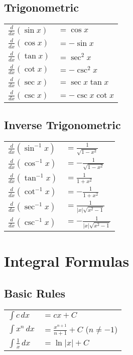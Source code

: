 \documentclass[12pt]{article}
\begin{document}
\vspace{1em}
\subsection*{Trigonometric}
\begin{tabular}{@{}ll@{}}
\toprule
$\displaystyle \frac{d}{dx}(\sin x)$ & $= \cos x$ \\
$\displaystyle \frac{d}{dx}(\cos x)$ & $= -\sin x$ \\
$\displaystyle \frac{d}{dx}(\tan x)$ & $= \sec^2 x$ \\
$\displaystyle \frac{d}{dx}(\cot x)$ & $= -\csc^2 x$ \\
$\displaystyle \frac{d}{dx}(\sec x)$ & $= \sec x \tan x$ \\
$\displaystyle \frac{d}{dx}(\csc x)$ & $= -\csc x \cot x$ \\
\bottomrule
\end{tabular}

\vspace{1em}
\subsection*{Inverse Trigonometric}
\begin{tabular}{@{}ll@{}}
\toprule
$\displaystyle \frac{d}{dx}(\sin^{-1}x)$ & $= \frac{1}{\sqrt{1 - x^2}}$ \\
$\displaystyle \frac{d}{dx}(\cos^{-1}x)$ & $= -\frac{1}{\sqrt{1 - x^2}}$ \\
$\displaystyle \frac{d}{dx}(\tan^{-1}x)$ & $= \frac{1}{1 + x^2}$ \\
$\displaystyle \frac{d}{dx}(\cot^{-1}x)$ & $= -\frac{1}{1 + x^2}$ \\
$\displaystyle \frac{d}{dx}(\sec^{-1}x)$ & $= \frac{1}{|x|\sqrt{x^2 - 1}}$ \\
$\displaystyle \frac{d}{dx}(\csc^{-1}x)$ & $= -\frac{1}{|x|\sqrt{x^2 - 1}}$ \\
\bottomrule
\end{tabular}

\newpage

\section*{Integral Formulas}

\subsection*{Basic Rules}
\begin{tabular}{@{}ll@{}}
\toprule
$\displaystyle \int c\,dx$ & $= cx + C$ \\
$\displaystyle \int x^n\,dx$ & $= \frac{x^{n+1}}{n+1} + C$ \quad ($n \ne -1$) \\
$\displaystyle \int \frac{1}{x}\,dx$ & $= \ln|x| + C$ \\
\bottomrule
\end{tabular}
\end{document}
